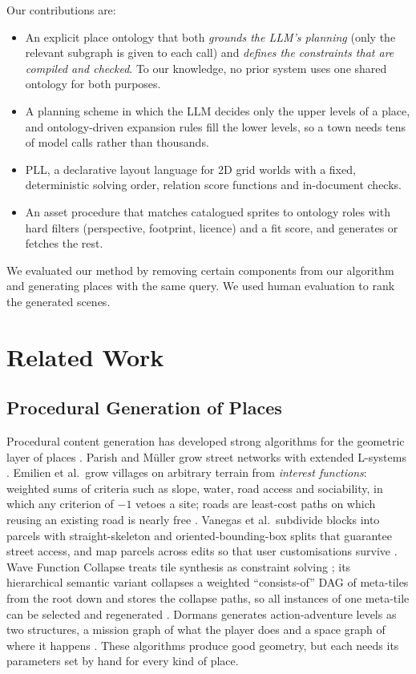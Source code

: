 \documentclass[conference]{IEEEtran}
\begin{document}
Our contributions are:
\begin{itemize}
\item An explicit place ontology that both \emph{grounds the LLM's planning} (only the
  relevant subgraph is given to each call) and \emph{defines the constraints that are
  compiled and checked}. To our knowledge, no prior system uses one shared ontology for
  both purposes.
\item A planning scheme in which the LLM decides only the upper levels of a place, and
  ontology-driven expansion rules fill the lower levels, so a town needs tens of model
  calls rather than thousands.
\item PLL, a declarative layout language for 2D grid worlds with a fixed, deterministic
  solving order, relation score functions and in-document checks.
\item An asset procedure that matches catalogued sprites to ontology roles with hard
  filters (perspective, footprint, licence) and a fit score, and generates or fetches the
  rest.
\end{itemize}
We evaluated our method by removing certain components from our algorithm and
generating places with the same query. We used human evaluation to rank the generated
scenes.

\section{Related Work}

\subsection{Procedural Generation of Places}
Procedural content generation has developed strong algorithms for the geometric layer
of places \cite{shaker2016pcg,togelius2011}. Parish and M\"uller grow street networks
with extended L-systems \cite{parish2001}. Emilien et al.\ grow villages on arbitrary
terrain from \emph{interest functions}: weighted sums of criteria such as slope, water,
road access and sociability, in which any criterion of $-1$ vetoes a site; roads are
least-cost paths on which reusing an existing road is nearly free \cite{emilien2012}.
Vanegas et al.\ subdivide blocks into parcels with straight-skeleton and
oriented-bounding-box splits that guarantee street access, and map parcels across edits
so that user customisations survive \cite{vanegas2012}. Wave Function Collapse treats
tile synthesis as constraint solving \cite{karth2017}; its hierarchical semantic variant
collapses a weighted ``consists-of'' DAG of meta-tiles from the root down and stores the
collapse paths, so all instances of one meta-tile can be selected and regenerated
\cite{alaka2023}. Dormans generates action-adventure levels as two structures, a mission
graph of what the player does and a space graph of where it happens \cite{dormans2010}.
These algorithms produce good geometry, but each needs its parameters set by hand for
every kind of place.
\end{document}
